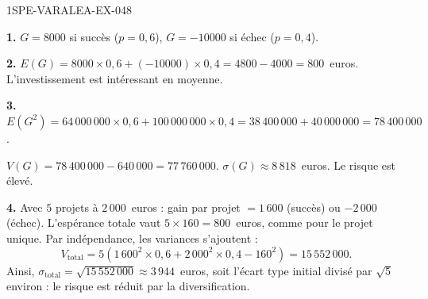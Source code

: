 \begin{corrige}{1SPE-VARALEA-EX-048}

\textbf{1.} $G = 8000$ si succès ($p = 0{,}6$), $G = -10000$ si échec ($p = 0{,}4$).

\medskip
\textbf{2.} $E(G) = 8000 \times 0{,}6 + (-10000) \times 0{,}4 = 4800 - 4000 = 800$~euros. L'investissement est intéressant en moyenne.

\medskip
\textbf{3.} $E(G^2) = 64\,000\,000 \times 0{,}6 + 100\,000\,000 \times 0{,}4 = 38\,400\,000 + 40\,000\,000 = 78\,400\,000$.

$V(G) = 78\,400\,000 - 640\,000 = 77\,760\,000$. $\sigma(G) \approx 8\,818$~euros. Le risque est élevé.

\medskip
\textbf{4.} Avec $5$ projets à $2\,000$~euros : gain par projet $= 1\,600$ (succès) ou $-2\,000$ (échec). L'espérance totale vaut $5 \times 160 = 800$~euros, comme pour le projet unique. Par indépendance, les variances s'ajoutent :
\[
V_{\mathrm{total}}
=5\left(1\,600^2\times0{,}6+2\,000^2\times0{,}4-160^2\right)
=15\,552\,000.
\]
Ainsi, $\sigma_{\mathrm{total}}=\sqrt{15\,552\,000}\approx 3\,944$~euros, soit l'écart type initial divisé par $\sqrt{5}$ environ : le risque est réduit par la diversification.

\end{corrige}
